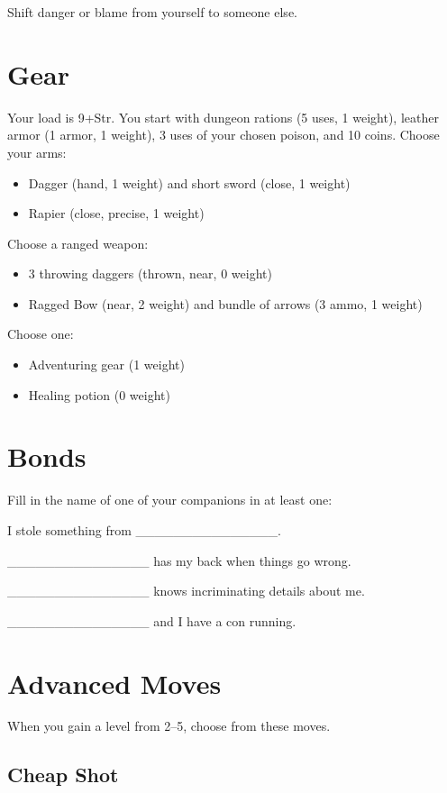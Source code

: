  Shift danger or blame from yourself to someone else.
\section{Gear}


 Your load is 9+Str. You start with dungeon rations (5 uses, 1 weight), leather armor (1 armor, 1 weight), 3 uses of your chosen poison, and 10 coins. Choose your arms:
\begin{itemize}
\item Dagger (hand, 1 weight) and short sword (close, 1 weight)
\item Rapier (close, precise, 1 weight)

\end{itemize}


 Choose a ranged weapon:
\begin{itemize}
\item 3 throwing daggers (thrown, near, 0 weight)
\item Ragged Bow (near, 2 weight) and bundle of arrows (3 ammo, 1 weight)

\end{itemize}


 Choose one:
\begin{itemize}
\item Adventuring gear (1 weight)
\item Healing potion (0 weight)

\end{itemize}
\section{Bonds}


 Fill in the name of one of your companions in at least one:


 I stole something from \_\_\_\_\_\_\_\_\_\_\_\_\_\_\_.


 \_\_\_\_\_\_\_\_\_\_\_\_\_\_\_ has my back when things go wrong.


 \_\_\_\_\_\_\_\_\_\_\_\_\_\_\_ knows incriminating details about me.


 \_\_\_\_\_\_\_\_\_\_\_\_\_\_\_ and I have a con running.
\section{Advanced Moves}


 {\Large When you gain a level from 2--5, choose from these moves.}
\subsection{Cheap Shot}


